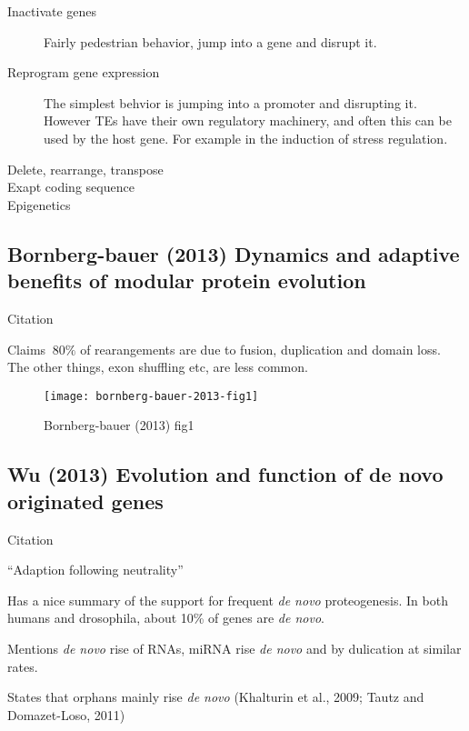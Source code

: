     \begin{description}
        \item[Inactivate genes] Fairly pedestrian behavior, jump into a gene and disrupt it.
        \item[Reprogram gene expression] The simplest behvior is jumping into a
            promoter and disrupting it. However TEs have their own regulatory
            machinery, and often this can be used by the host gene. For example
            in the induction of stress regulation.
        \item[Delete, rearrange, transpose] 
        \item[Exapt coding sequence]
        \item[Epigenetics]
    \end{description}

\subsection{Bornberg-bauer (2013) Dynamics and adaptive benefits of modular
protein evolution}

    Citation \cite{bornberg-bauer_dynamics_2013}

    Claims $~80\%$ of rearangements are due to fusion, duplication and domain
    loss. The other things, exon shuffling etc, are less common.

    \begin{figure}[h!]
        \centering
        \texttt{[image: bornberg-bauer-2013-fig1]}
        \caption{Bornberg-bauer (2013) fig1}
    \end{figure}
    \FloatBarrier

\subsection{Wu (2013) Evolution and function of de novo
originated genes}

    Citation \cite{wu_evolution_2013}

    ``Adaption following neutrality''

    Has a nice summary of the support for frequent \textit{de novo}
    proteogenesis. In both humans and drosophila, about 10\% of genes are
    \textit{de novo}.

    Mentions \textit{de novo} rise of RNAs, miRNA rise \textit{de novo} and
    by dulication at similar rates.

    States that orphans mainly rise \textit{de novo} (Khalturin et al.,
    2009; Tautz and Domazet-Loso, 2011)


